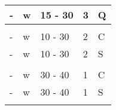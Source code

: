 \begin{table}[!htb]
\begin{tabular}{lllll}
\multicolumn{1}{|l|}{-}                                     & \multicolumn{1}{l|}{w}                                  & \multicolumn{1}{l|}{15 - 30}                       & \multicolumn{1}{l|}{3}                                      & \multicolumn{1}{l|}{Q}                                          \\ \hline
                                                            &                                                         &                                                    &                                                             &                                                                 \\ \hline
\multicolumn{1}{|l|}{-}                                     & \multicolumn{1}{l|}{w}                                  & \multicolumn{1}{l|}{10 - 30}                       & \multicolumn{1}{l|}{2}                                      & \multicolumn{1}{l|}{C}                                          \\ \hline
\multicolumn{1}{|l|}{-}                                     & \multicolumn{1}{l|}{w}                                  & \multicolumn{1}{l|}{10 - 30}                       & \multicolumn{1}{l|}{2}                                      & \multicolumn{1}{l|}{S}                                          \\ \hline
                                                            &                                                         &                                                    &                                                             &                                                                 \\ \hline
\multicolumn{1}{|l|}{-}                                     & \multicolumn{1}{l|}{w}                                  & \multicolumn{1}{l|}{30 - 40}                       & \multicolumn{1}{l|}{1}                                      & \multicolumn{1}{l|}{C}                                          \\ \hline
\multicolumn{1}{|l|}{-}                                     & \multicolumn{1}{l|}{w}                                  & \multicolumn{1}{l|}{30 - 40}                       & \multicolumn{1}{l|}{1}                                      & \multicolumn{1}{l|}{S}                                          \\ \hline
                                                            &                                                         &                                                    &                                                             &                                                                 \\ \hline

\end{tabular}
\end{table}
